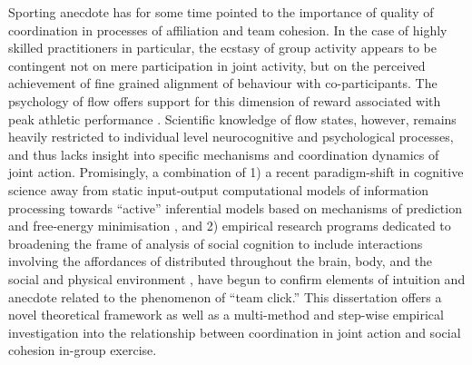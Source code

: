 Sporting anecdote has for some time pointed to the importance of quality of coordination in processes of affiliation and team cohesion.  In the case of highly skilled practitioners in particular, the ecstasy of group activity appears to be contingent not on mere participation in joint activity, but on the perceived achievement of fine grained alignment of behaviour with co-participants.  The psychology of flow offers support for this dimension of reward associated with peak athletic performance \citep{Jackson1995}. Scientific knowledge of flow states, however, remains heavily restricted to individual level neurocognitive and psychological processes, and thus lacks insight into specific mechanisms and coordination dynamics of joint action.  Promisingly, a combination of 1) a recent paradigm-shift in cognitive science away from static input-output computational models of information processing towards ``active'' inferential models based on mechanisms of prediction and free-energy minimisation \citep{Friston2010,Clark2013}, and 2) empirical research programs dedicated to broadening the frame of analysis of social cognition to include interactions involving the affordances of distributed throughout the brain, body, and the social and physical environment \citep{Sebanz2006,Semin2008}, have begun to confirm elements of intuition and anecdote related to the phenomenon of ``team click.''  This dissertation offers a novel theoretical framework as well as a multi-method and step-wise empirical investigation into the relationship between coordination in joint action and social cohesion in-group exercise.

